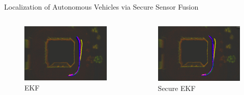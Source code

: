 \documentclass[10pt]{beamer}
\begin{document}
\begin{frame}{Localization of Autonomous Vehicles via Secure Sensor Fusion}
  \begin{columns}
    \begin{column}{0.48\textwidth}
      \begin{figure}
	\includegraphics[width=\textwidth]{gnssdrift.jpg}
	\caption{EKF}
      \end{figure}
    \end{column}
    \begin{column}{0.48\textwidth} 		
      \begin{figure}
	\includegraphics[width=\textwidth]{gnssdriftsafe.jpg}
	\caption{Secure EKF}
      \end{figure}
    \end{column}
  \end{columns}
\end{frame}
\end{document}
